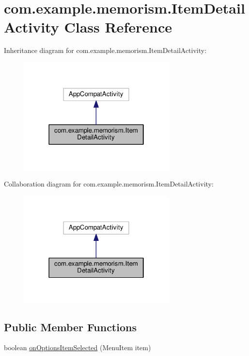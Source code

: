 \hypertarget{classcom_1_1example_1_1memorism_1_1_item_detail_activity}{}\section{com.\+example.\+memorism.\+Item\+Detail\+Activity Class Reference}
\label{classcom_1_1example_1_1memorism_1_1_item_detail_activity}


Inheritance diagram for com.\+example.\+memorism.\+Item\+Detail\+Activity\+:\nopagebreak
\begin{figure}[H]
\begin{center}
\leavevmode
\includegraphics[width=226pt]{d6/d8a/classcom_1_1example_1_1memorism_1_1_item_detail_activity__inherit__graph}
\end{center}
\end{figure}


Collaboration diagram for com.\+example.\+memorism.\+Item\+Detail\+Activity\+:\nopagebreak
\begin{figure}[H]
\begin{center}
\leavevmode
\includegraphics[width=226pt]{d8/deb/classcom_1_1example_1_1memorism_1_1_item_detail_activity__coll__graph}
\end{center}
\end{figure}
\subsection*{Public Member Functions}
\begin{DoxyCompactItemize}
\item 
boolean \hyperlink{classcom_1_1example_1_1memorism_1_1_item_detail_activity_af86a22f6772eb4109179456eeb1ecd4e}{on\+Options\+Item\+Selected} (Menu\+Item item)
\end{DoxyCompactItemize}
